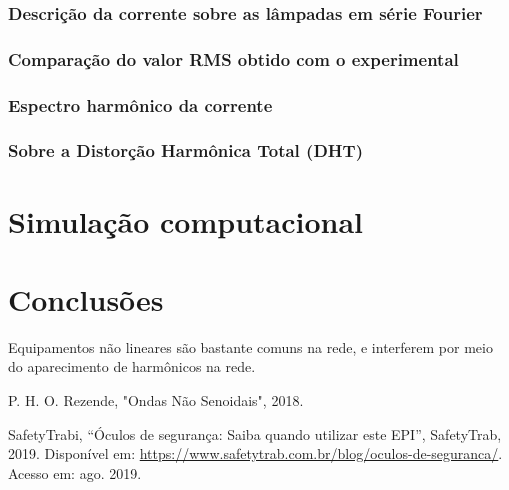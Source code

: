 \documentclass[a4paper,12pt,oneside,openany,table,xcdraw]{article}
\begin{document}
\subsubsection{Descrição da corrente sobre as lâmpadas em série Fourier}

\subsubsection{Comparação do valor RMS obtido com o experimental}

\subsubsection{Espectro harmônico da corrente}

\subsubsection{Sobre a Distorção Harmônica Total (DHT)}



\vspace{1cm}
\section{Simulação computacional} %

\vspace{2cm}
\section{Conclusões} %
Equipamentos não lineares são bastante comuns na rede, e interferem por meio do aparecimento de harmônicos na rede.

\newpage
\begin{thebibliography}{9} 
    P. H. O. Rezende,
    "Ondas Não Senoidais", 2018.

    SafetyTrabi,
    “Óculos de segurança: Saiba quando utilizar este EPI”, SafetyTrab, 2019.
 Disponível em:
 \url{https://www.safetytrab.com.br/blog/oculos-de-seguranca/}. Acesso em: ago. 2019.

\end{thebibliography}
\end{document}
